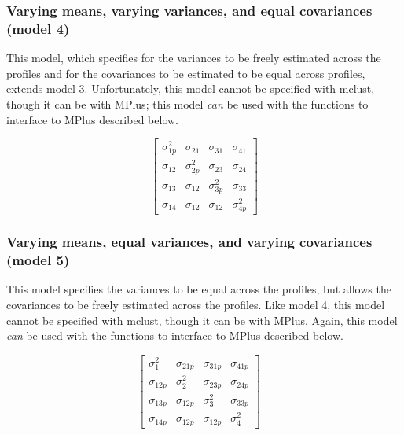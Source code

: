\documentclass[]{book}
\theoremstyle{definition}
\theoremstyle{definition}
\theoremstyle{definition}
\theoremstyle{remark}
\begin{document}
\subsubsection{Varying means, varying variances, and equal covariances
(model
4)}\label{varying-means-varying-variances-and-equal-covariances-model-4}

This model, which specifies for the variances to be freely estimated
across the profiles and for the covariances to be estimated to be equal
across profiles, extends model 3. Unfortunately, this model cannot be
specified with mclust, though it can be with MPlus; this model
\emph{can} be used with the functions to interface to MPlus described
below.

\[
\left[ \begin{matrix} { \sigma  }_{ 1p }^{ 2 } & { \sigma  }_{ 21 } & { \sigma  }_{ 31 } & { \sigma  }_{ 41 } \\ { \sigma  }_{ 12 } & { \sigma  }_{ 2p }^{ 2 } & { \sigma  }_{ 23 } & { \sigma  }_{ 24 } \\ { \sigma  }_{ 13 } & { \sigma  }_{ 12 } & { \sigma  }_{ 3p }^{ 2 } & { \sigma  }_{ 33 } \\ { \sigma  }_{ 14 } & { \sigma  }_{ 12 } & { \sigma  }_{ 12 } & { \sigma  }_{ 4p }^{ 2 } \end{matrix} \right] 
\]

\subsubsection{Varying means, equal variances, and varying covariances
(model
5)}\label{varying-means-equal-variances-and-varying-covariances-model-5}

This model specifies the variances to be equal across the profiles, but
allows the covariances to be freely estimated across the profiles. Like
model 4, this model cannot be specified with mclust, though it can be
with MPlus. Again, this model \emph{can} be used with the functions to
interface to MPlus described below.

\[
\left[ \begin{matrix} { \sigma  }_{ 1 }^{ 2 } & { \sigma  }_{ 21p } & { \sigma  }_{ 31p } & { \sigma  }_{ 41p } \\ { \sigma  }_{ 12p } & { \sigma  }_{ 2 }^{ 2 } & { \sigma  }_{ 23p } & { \sigma  }_{ 24p } \\ { \sigma  }_{ 13p } & { \sigma  }_{ 12p } & { \sigma  }_{ 3 }^{ 2 } & { \sigma  }_{ 33p } \\ { \sigma  }_{ 14p } & { \sigma  }_{ 12p } & { \sigma  }_{ 12p } & { \sigma  }_{ 4 }^{ 2 } \end{matrix} \right] \quad 
\]
\end{document}
